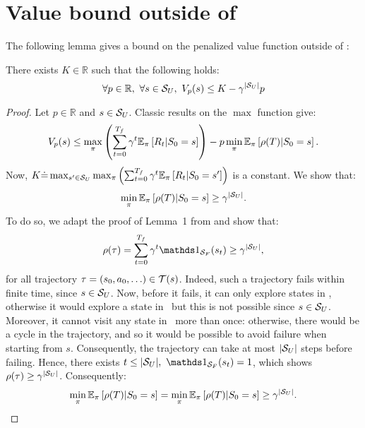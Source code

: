 \section{Value bound outside of \SV}
The following lemma gives a bound on the penalized value function outside of \SV:
\begin{lemma}[Bound on $V_p$]
	There exists $K\in\mathbb{R}$ such that the following holds:
	\begin{equation}
	\forall p\in\mathbb{R},~\forall s\in{\ensuremath{\mathcal{S}}_{U}},~V_p(s) \leq K - \gamma^{\left|{\mathcal{S}_{U}}\right|}p
	\end{equation}
	\label{lemma:value bound outside sv}
\end{lemma}
\begin{proof}
	Let $p\in\mathbb{R}$ and $s\in{\ensuremath{\mathcal{S}}_{U}}$. Classic results on the $\max$ function give:
	$$
	V_p(s) \leq \max_\pi\left(\sum_{t=0}^{{T_f}}\gamma^t\mathbb{E}_{\pi}\left[R_t\middle|S_0=s\right]\right) - p\min_\pi\mathbb{E}_{\pi}\left[\rho(T)\middle|S_0=s\right].
	$$
	Now, $K\dot{=} \max_{s'\in{\ensuremath{\mathcal{S}}_{U}}}\max_\pi\left(\sum_{t=0}^{{T_f}}\gamma^t\mathbb{E}_{\pi}\left[R_t\middle|S_0=s'\right]\right)$ is a constant. We show that:
	$$
		\min_\pi\mathbb{E}_{\pi}\left[\rho(T)\middle|S_0=s\right] \geq \gamma^{\left|{\mathcal{S}_{U}}\right|}.
	$$
	To do so, we adapt the proof of Lemma~1 from \cite{heim2020learnable} and show that: 
	$$
		\rho(\tau) = \sum_{t=0}^\Tf\gamma^t\indicator_\SF(s_t) \geq \gamma^\card{\SU},
	$$ 
	for all trajectory $\tau = (s_0, a_0, \hdots)\in\mathcal{T}(s)$. Indeed, such a trajectory fails within finite time, since $s\in{\ensuremath{\mathcal{S}}_{U}}$. Now, before it fails, it can only explore states in \SU, otherwise it would explore a state in \SV~but this is not possible since $s\in{\ensuremath{\mathcal{S}}_{U}}$. Moreover, it cannot visit any state in \SU~more than once: otherwise, there would be a cycle in the trajectory, and so it would be possible to avoid failure when starting from $s$. Consequently, the trajectory can take at most ${\left|{\mathcal{S}_{U}}\right|}$ steps before failing. Hence, there exists $t\leq\card{\SU},~\indicator_\SF(s_t) = 1$, which shows $\rho(\tau) \geq \gamma^{\left|{\mathcal{S}_{U}}\right|}$. Consequently: 
	$$\min_\pi\mathbb{E}_{\pi}\left[\rho(T)\middle|S_0=s\right] = \min_\pi\mathbb{E}_{\pi}\left[\rho(T)\middle|S_0=s\right] \geq \gamma^{\left|{\mathcal{S}_{U}}\right|}.$$
\end{proof}

